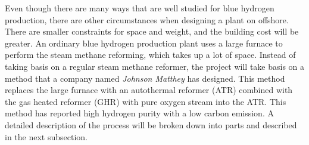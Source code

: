 Even though there are many ways that are well studied for blue hydrogen production, there are other circumstances when designing a plant on offshore. There are smaller constraints for space and weight, and the building cost will be greater. An ordinary blue hydrogen production plant uses a large furnace to perform the steam methane reforming, which takes up a lot of space. Instead of taking basis on a regular steam methane reformer, the project will take basis on a method that a company named \textit{Johnson Matthey} has designed. This method replaces the large furnace with an autothermal reformer (ATR) combined with the gas heated reformer (GHR) with pure oxygen stream into the ATR. This method has reported high hydrogen purity with a low carbon emission. A detailed description of the process will be broken down into parts and described in the next subsection. 